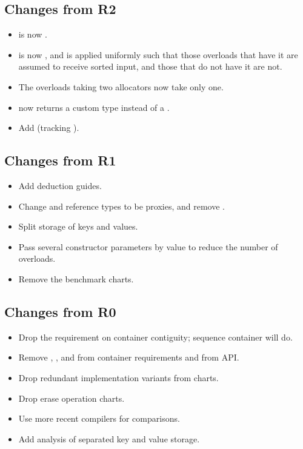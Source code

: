 \subsection{Changes from R2}

\begin{itemize}
  \item {} is now .
  \item {} is now , and
    is applied uniformly such that those overloads that have it are assumed to
    receive sorted input, and those that do not have it are not.
  \item The overloads taking two allocators now take only one.
  \item {} now returns a custom type instead of a .
  \item Add  (tracking ).
\end{itemize}

\subsection{Changes from R1}

\begin{itemize}
  \item Add deduction guides.
  \item Change  and reference types to be proxies, and remove
    .
  \item Split storage of keys and values.
  \item Pass several constructor parameters by value to reduce the number of overloads.
  \item Remove the benchmark charts.
\end{itemize}

\subsection{Changes from R0}

\begin{itemize}
  \item Drop the requirement on container contiguity; sequence container will
    do.
  \item Remove , , and 
    from container requirements and from  API.
  \item Drop redundant implementation variants from charts.
  \item Drop erase operation charts.
  \item Use more recent compilers for comparisons.
  \item Add analysis of separated key and value storage.
\end{itemize}
